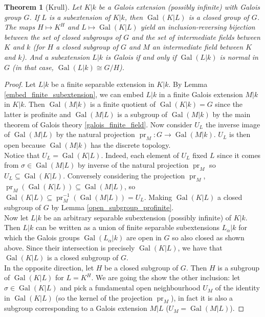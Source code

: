 \documentclass{article}
\theoremstyle{plain}
\newtheorem{theorem}{Theorem}[subsection]
\theoremstyle{definition}
\DeclareMathOperator{\Gal}{Gal}
\DeclareMathOperator{\pr}{pr}
\begin{document}
\begin{theorem}[Krull]
    Let $K|k$ be a Galois extension (possibly infinite) with Galois group $G$. If $L$ is a subextension of $K|k$, then $\Gal(K|L)$ is a closed group of $G$.
    The maps $H\mapsto K^H$ and $L\mapsto \Gal(K|L)$ yield an inclusion-reversing bijection between the set of closed subgroups of $G$ and the set of intermediate fields between $K$ and $k$ (for $H$ a closed subgroup of $G$ and $M$ an intermediate field between $K$ and $k$).
    And a subextension $L|k$ is Galois if and only if $\Gal(L|k)$ is normal in $G$ (in that case, $\Gal(L|k) \cong G/H$).
\end{theorem}
\begin{proof}
    Let $L|k$ be a finite separable extension in $K|k$.
    By Lemma \ref{embed_finite_subextension}, we can embed $L|k$ in a finite Galois extension $M|k$ in $K|k$.
    Then $\Gal(M|k)$ is a finite quotient of $\Gal(K|k) = G$ since the latter is profinite and $\Gal(M|L)$ is a subgroup of $\Gal(M|k)$ by the main theorem of Galois theory \ref{galois_finite_field}. Now consider $U_L$ the inverse image of $\Gal(M|L)$ by the natural projection $\pr_M:G \rightarrow \Gal(M|k)$. $U_L$ is then open because $\Gal(M|k)$ has the discrete topology.\\
    Notice that $U_L = \Gal(K|L)$. 
    Indeed, each element of $U_L$ fixed $L$ since it comes from $\sigma\in\Gal(M|L)$ by inverse of the natural projection $\pr_M$ so $U_L\subseteq \Gal(K|L)$. 
    Conversely considering the projection $\pr_M$, $\pr_M(\Gal(K|L))\subseteq \Gal(M|L)$, so $\Gal(K|L) \subseteq \pr_M^{-1}(\Gal(M|L)) = U_L$. 
    Making $\Gal(K|L)$ a closed subgroup of $G$ by Lemma \ref{open_subgroup_profinite}.\\
    Now let $L|k$ be an arbitrary separable subextension (possibly infinite) of $K|k$.
    Then $L|k$ can be written as a union of finite separable subextensions $L_{\alpha}|k$ for which the Galois groups $\Gal(L_{\alpha}|k)$ are open in $G$ so also closed as shown above.
    Since their intersection is precisely $\Gal(K|L)$, we have that $\Gal(K|L)$ is a closed subgroup of $G$.\\
    In the opposite direction, let $H$ be a closed subgroup of $G$.
    Then $H$ is a subgroup of $\Gal(K|L)$ for $L = K^H$. We are going the show the other inclusion: 
    let $\sigma\in \Gal(K|L)$ and pick a fundamental open neighbourhood $U_M$ of the identity in $\Gal(K|L)$ (so the kernel of the projection $\pr_M$), in fact it is also a subgroup corresponding to a Galois extension $M|L$ ($U_M = \Gal(M|L)$).

\end{proof}
\end{document}
